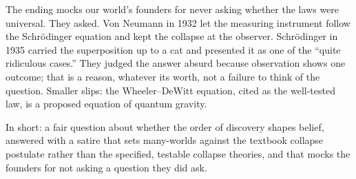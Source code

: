 \begin{afterword}
The ending mocks our world's founders for never asking whether the laws were universal. They asked. Von Neumann in 1932 let the measuring instrument follow the Schrödinger equation and kept the collapse at the observer. Schrödinger in 1935 carried the superposition up to a cat and presented it as one of the ``quite ridiculous cases.'' They judged the answer absurd because observation shows one outcome; that is a reason, whatever its worth, not a failure to think of the question. Smaller slips: the Wheeler--DeWitt equation, cited as the well-tested law, is a proposed equation of quantum gravity.

In short: a fair question about whether the order of discovery shapes belief, answered with a satire that sets many-worlds against the textbook collapse postulate rather than the specified, testable collapse theories, and that mocks the founders for not asking a question they did ask.
\end{afterword}

